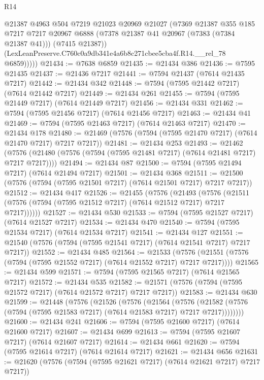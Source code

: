 \begin{lexlean}{R14}
\begin{coremodule}
            @21387
            @4963
            @504
            @7219
            @21023
            @20969
            @21027
            (@7369
              @21387
              @355
              @185
              @7217
              @7217
              @20967
              @6888
              (@7378 @21387 @41 @20967 (@7383 (@7384 @21387 @41)))
              (@7415 @21387))
            (LexLeanPreserve.C760c0a9db341e4a6b8c271cbee5cba4f.R14.__rel_78 @6859)))))
@21434 := @7638 @6859
@21435 := @21434 @386
@21436 := @7595 @21435
@21437 := @21436 @7217
@21441 := @7594 @21437 (@7614 @21435 @7217)
@21442 := @21434 @342
@21448 := @7594 (@7595 @21442 @7217) (@7614 @21442 @7217)
@21449 := @21434 @261
@21455 := @7594 (@7595 @21449 @7217) (@7614 @21449 @7217)
@21456 := @21434 @331
@21462 := @7594 (@7595 @21456 @7217) (@7614 @21456 @7217)
@21463 := @21434 @41
@21469 := @7594 (@7595 @21463 @7217) (@7614 @21463 @7217)
@21470 := @21434 @178
@21480 := @21469 (@7576 (@7594 (@7595 @21470 @7217) (@7614 @21470 @7217) @7217 @7217))
@21481 := @21434 @253
@21493 := @21462
    (@7576 (@21480 (@7576 (@7594 (@7595 @21481 @7217) (@7614 @21481 @7217) @7217 @7217))))
@21494 := @21434 @87
@21500 := @7594 (@7595 @21494 @7217) (@7614 @21494 @7217)
@21501 := @21434 @368
@21511 := @21500 (@7576 (@7594 (@7595 @21501 @7217) (@7614 @21501 @7217) @7217 @7217))
@21512 := @21434 @417
@21526 := @21455
    (@7576
      (@21493
        (@7576 (@21511 (@7576 (@7594 (@7595 @21512 @7217) (@7614 @21512 @7217) @7217 @7217))))))
@21527 := @21434 @530
@21533 := @7594 (@7595 @21527 @7217) (@7614 @21527 @7217)
@21534 := @21434 @470
@21540 := @7594 (@7595 @21534 @7217) (@7614 @21534 @7217)
@21541 := @21434 @127
@21551 := @21540 (@7576 (@7594 (@7595 @21541 @7217) (@7614 @21541 @7217) @7217 @7217))
@21552 := @21434 @485
@21564 := @21533
    (@7576 (@21551 (@7576 (@7594 (@7595 @21552 @7217) (@7614 @21552 @7217) @7217 @7217))))
@21565 := @21434 @599
@21571 := @7594 (@7595 @21565 @7217) (@7614 @21565 @7217)
@21572 := @21434 @535
@21582 := @21571 (@7576 (@7594 (@7595 @21572 @7217) (@7614 @21572 @7217) @7217 @7217))
@21583 := @21434 @630
@21599 := @21448
    (@7576
      (@21526
        (@7576
          (@21564
            (@7576
              (@21582 (@7576 (@7594 (@7595 @21583 @7217) (@7614 @21583 @7217) @7217 @7217))))))))
@21600 := @21434 @241
@21606 := @7594 (@7595 @21600 @7217) (@7614 @21600 @7217)
@21607 := @21434 @699
@21613 := @7594 (@7595 @21607 @7217) (@7614 @21607 @7217)
@21614 := @21434 @661
@21620 := @7594 (@7595 @21614 @7217) (@7614 @21614 @7217)
@21621 := @21434 @656
@21631 := @21620 (@7576 (@7594 (@7595 @21621 @7217) (@7614 @21621 @7217) @7217 @7217))

\end{coremodule}
\end{lexlean}
